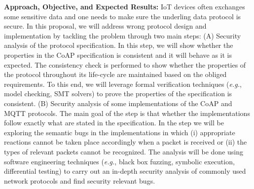 \documentclass[10pt,onecolumn]{article}
\newcommand{\eg}{\textit{e.g.}\xspace}
\begin{document}
\noindent\textbf{Approach, Objective, and Expected Results:} IoT devices often exchanges some sensitive data and one needs to make sure the underling data protocol is secure. In this proposal, we will address wrong protocol design and implementation by tackling the problem through two main steps: (A) Security analysis of the protocol specification. In this step, we will show whether the properties in the CoAP specification is consistent and it will behave as it is expected. The consistency check is performed to show whether the properties of the protocol throughout its life-cycle are maintained based on the obliged requirements. To this end, we will leverage formal verification techniques (\eg, model checking, SMT solvers) to prove the properties of the specification is consistent. (B) Security analysis of some implementations of the CoAP and MQTT protocols. The main goal of the step is that whether the implementations follow exactly what are stated in the specification. In the step we will be exploring the semantic bugs in the implementations in which (i) appropriate reactions cannot be taken place accordingly when a packet is received or (ii) the types of relevant packets cannot be recognized. The analysis will be done using software engineering techniques (\eg, black box fuzzing, symbolic execution, differential testing) to carry out an in-depth security analysis of commonly used network protocols and find security relevant bugs. 




\end{document}
